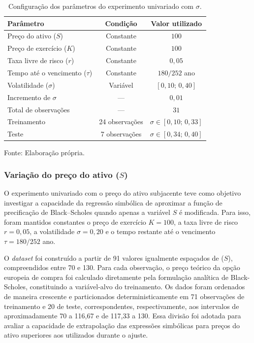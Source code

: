 \begin{table}[htbp]
    \centering
    \caption{Configuração dos parâmetros do experimento univariado com $\sigma$.}
    \label{tab:parametros_sigma}

    \begin{tabular}{lcc}
        \hline
        \textbf{Parâmetro} &
        \textbf{Condição} &
        \textbf{Valor utilizado} \\
        \hline
        Preço do ativo ($S$) & Constante & $100$ \\
        Preço de exercício ($K$) & Constante & $100$ \\
        Taxa livre de risco ($r$) & Constante & $0{,}05$ \\
        Tempo até o vencimento ($\tau$) &
        Constante & $180/252$ ano \\
        Volatilidade ($\sigma$) &
        Variável & $[0{,}10;\,0{,}40]$ \\
        Incremento de $\sigma$ & --- & $0{,}01$ \\
        \hline
        Total de observações & --- & $31$ \\
        Treinamento & 24 observações &
        $\sigma \in [0{,}10;\,0{,}33]$ \\
        Teste & 7 observações &
        $\sigma \in [0{,}34;\,0{,}40]$ \\
        \hline
    \end{tabular}

    \vspace{0.2cm}
    {\footnotesize Fonte: Elaboração própria.\par}
\end{table}

\subsubsection*{Variação do preço do ativo ($S$)}
O experimento univariado com o preço do ativo subjacente  
teve como objetivo investigar a capacidade da regressão simbólica de aproximar a função de precificação de Black--Scholes quando apenas a variável $S$ é modificada. Para isso, foram mantidos constantes o preço de exercício $K=100$, a taxa livre de risco $r=0{,}05$, a volatilidade $\sigma=0{,}20$ e o tempo restante até o vencimento $\tau=180/252$ ano.

O \textit{dataset} foi construído a partir de 91 valores igualmente espaçados de ($S$), compreendidos entre 70 e 130. Para cada observação, o preço teórico da opção europeia de compra foi calculado diretamente pela formulação analítica de Black-Scholes, constituindo a variável-alvo do treinamento. Os dados foram ordenados de maneira crescente e particionados deterministicamente em 71 observações de treinamento e 20 de teste, correspondentes, respectivamente, aos intervalos de aproximadamente 70 a 116,67 e de 117,33 a 130. Essa divisão foi adotada para avaliar a capacidade de extrapolação das expressões simbólicas para preços do ativo superiores aos utilizados durante o ajuste.

